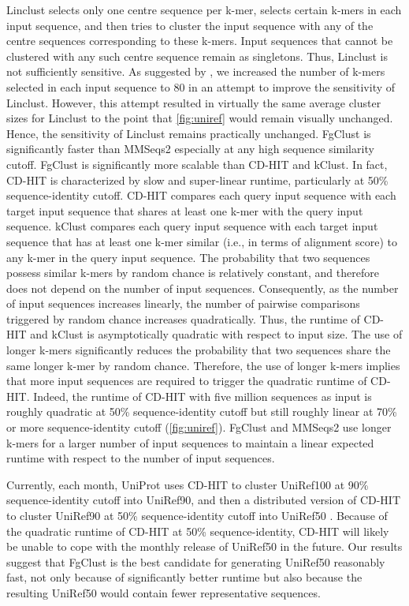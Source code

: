 \documentclass{bioinfo}
\begin{document}
Linclust
selects only one centre sequence per k-mer, 
selects certain k-mers in each input sequence, 
and then tries to cluster the input sequence with any of the centre sequences corresponding to these k-mers.
Input sequences that cannot be clustered with any such centre sequence remain as singletons.
Thus, Linclust is not sufficiently sensitive.
As suggested by \citet{steinegger2017linclust},
we increased the number of k-mers selected in each input sequence to 80 in an attempt to improve the sensitivity of Linclust.
However, this attempt resulted in virtually the same average cluster sizes for Linclust to the point that \cref{fig:uniref} would remain visually unchanged. Hence, the sensitivity of Linclust remains practically unchanged.
FgClust is significantly faster than MMSeqs2 especially at any high sequence similarity cutoff.
FgClust is significantly more scalable than CD-HIT and kClust. 
In fact, CD-HIT is characterized by slow and super-linear runtime, particularly at 50\% sequence-identity cutoff.
CD-HIT compares each query input sequence with each target input sequence that shares at least one k-mer with the query input sequence.
kClust compares each query input sequence with each target input sequence that has at least one k-mer similar (i.e., in terms of alignment score) to any k-mer in the query input sequence.
The probability that two sequences possess similar k-mers by random chance is relatively constant, and therefore does not depend on the number of input sequences.
Consequently, as the number of input sequences increases linearly, the number of pairwise comparisons triggered by random chance increases quadratically.
Thus, the runtime of CD-HIT and kClust is asymptotically quadratic with respect to input size.
The use of longer k-mers significantly reduces the probability that two sequences share the same longer k-mer by random chance.
Therefore, the use of longer k-mers implies that more input sequences are required to trigger the quadratic runtime of CD-HIT.
Indeed, the runtime of CD-HIT with five million sequences as input is roughly quadratic at 50\% sequence-identity cutoff but still roughly linear at 70\% or more sequence-identity cutoff (\cref{fig:uniref}).
FgClust and MMSeqs2 use longer k-mers for a larger number of input sequences to maintain a linear expected runtime with respect to the number of input sequences.

Currently, each month, UniProt uses CD-HIT to cluster UniRef100 at 90\% sequence-identity cutoff into UniRef90, and then a distributed version of CD-HIT to cluster UniRef90 at 50\% sequence-identity cutoff into UniRef50 \citep{suzek2014uniref}.
Because of the quadratic runtime of CD-HIT at 50\% sequence-identity, CD-HIT will likely be unable to cope with the monthly release of UniRef50 in the future.
Our results suggest that FgClust is the best candidate for generating UniRef50 reasonably fast, not only because of significantly better runtime but also because the resulting UniRef50 would contain fewer representative sequences.
\end{document}
